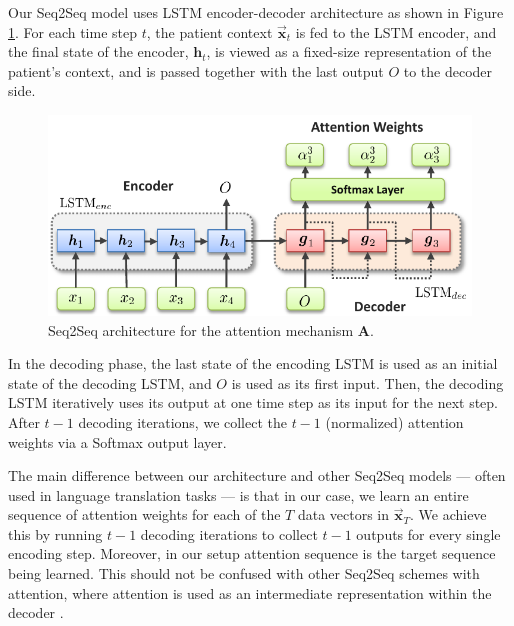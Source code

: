 \documentclass [PhD] {uclathes}
\begin{document}
Our Seq2Seq model uses LSTM encoder-decoder architecture as shown in Figure \ref{ch5fig2}. For each time step $t$, the patient context $\boldsymbol{\vec{x}}_t$ is fed to the LSTM encoder, and the final state of the encoder, $\boldsymbol{h}_t$, is viewed as a fixed-size representation of the patient's context, and is passed together with the last output $O$ to the decoder side. 

\begin{figure}[h]
\centering
\includegraphics[width=4.75in]{ch5Fig2.pdf}
\caption{Seq2Seq architecture for the attention mechanism $\boldsymbol{A}$.}
\label{ch5fig2}
\end{figure}

In the decoding phase, the last state of the encoding LSTM is used as an initial state of the decoding LSTM, and $O$ is used as its first input. Then, the decoding LSTM iteratively uses its output at one time step as its input for the next step. After $t-1$ decoding iterations, we collect the $t-1$ (normalized) attention weights via a Softmax output layer.  

The main difference between our architecture and other Seq2Seq models --- often used in language translation tasks \cite{bahdanau2014neural,sutskever2014sequence} --- is that in our case, we learn an entire sequence of attention weights for each of the $T$ data vectors in $\boldsymbol{\vec{x}}_{T}$. We achieve this by running $t-1$ decoding iterations to collect $t-1$ outputs for every single encoding step. Moreover, in our setup attention sequence is the target sequence being learned. This should not be confused with other Seq2Seq schemes with attention, where attention is used as an intermediate representation within the decoder \cite{vaswani2017attention}. 
\end{document}
